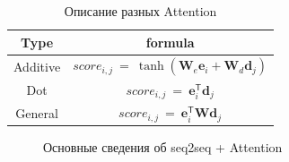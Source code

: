 \documentclass[11pt, a4paper]{article}
\begin{document}
\begin{table}[h!]
\begin{center}
\caption{Описание разных Attention}
\label{tab1}
\begin{tabular}{|c|c|}
\hline
	Type & formula\\
	\hline
	Additive& $score_{i,j}~=~\tanh\left(\textbf{W}_e\textbf{e}_i+\textbf{W}_d\textbf{d}_j\right)$\\
	\hline
	Dot& $score_{i,j}~=~\textbf{e}_i^{\mathsf{T}}\textbf{d}_j$\\
	\hline
	General& $score_{i,j}~=~\textbf{e}_i^{\mathsf{T}}\textbf{W}\textbf{d}_j$\\
\hline
\end{tabular}

\end{center}
\end{table}

\begin{figure}[h!]\center
{}
\caption{Основные сведения об seq2seq + Attention}
\end{figure}
\end{document}
